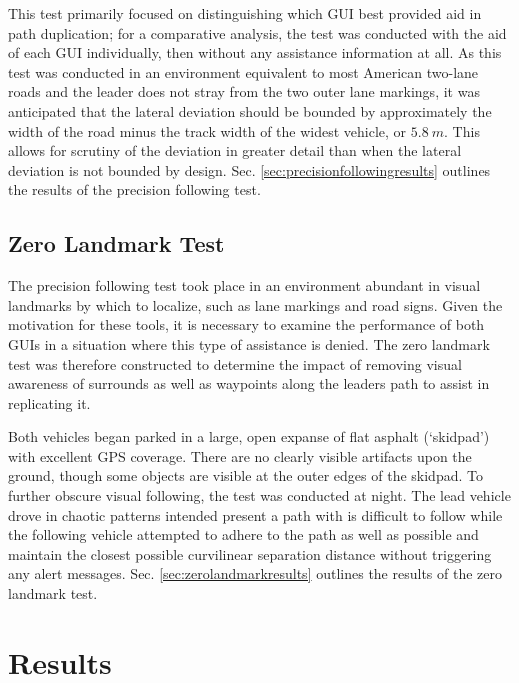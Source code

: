 This test primarily focused on distinguishing which GUI best provided aid in path duplication; for a comparative analysis, the test was conducted with the aid of each GUI individually, then without any assistance information at all. As this test was conducted in an environment equivalent to most American two-lane roads and the leader does not stray from the two outer lane markings, it was anticipated that the lateral deviation should be bounded by approximately the width of the road minus the track width of the widest vehicle, or $5.8~m$. This allows for scrutiny of the deviation in greater detail than when the lateral deviation is not bounded by design. Sec. \ref{sec:precisionfollowingresults} outlines the results of the precision following test.

\subsection{Zero Landmark Test} \label{sec:zerolandmarktest}
The precision following test took place in an environment abundant in visual landmarks by which to localize, such as lane markings and road signs. Given the motivation for these tools, it is necessary to examine the performance of both GUIs in a situation where this type of assistance is denied. The zero landmark test was therefore constructed to determine the impact of removing visual awareness of surrounds as well as waypoints along the leaders path to assist in replicating it.

Both vehicles began parked in a large, open expanse of flat asphalt (`skidpad') with excellent GPS coverage. There are no clearly visible artifacts upon the ground, though some objects are visible at the outer edges of the skidpad. To further obscure visual following, the test was conducted at night. The lead vehicle drove in chaotic patterns intended present a path with is difficult to follow while the following vehicle attempted to adhere to the path as well as possible and maintain the closest possible curvilinear separation distance without triggering any alert messages. Sec. \ref{sec:zerolandmarkresults} outlines the results of the zero landmark test.







\section{Results} \label{sec:results}

